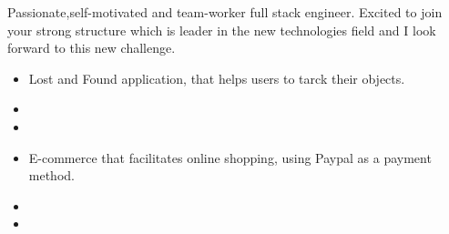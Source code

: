 \documentclass[10pt,a4paper,ragged2e,withhyper]{altacv}
\begin{document}
\begin{paracol}{2}

\switchcolumn


Passionate,self-motivated and team-worker full stack engineer. Excited to join your strong structure which is leader in the new technologies field and I look forward to this new challenge.

            \begin{itemize}
                 \item Lost and Found application, that helps users to tarck their objects.
                \item 
                \item 
            \end{itemize}
            
            \divider
            \begin{itemize}
                \item E-commerce that facilitates online shopping, using Paypal as a payment method. 
                \item 
                \item 
            \end{itemize}
              \\
               \smallskip

            \\


\end{paracol}
\end{document}
